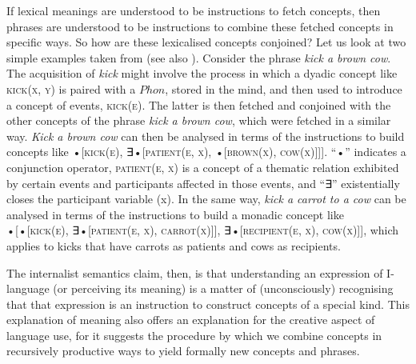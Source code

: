 If lexical meanings are understood to be instructions to fetch concepts, then phrases are understood to be instructions to combine these fetched concepts in specific ways. So how are these lexicalised concepts conjoined? Let us look at two simple examples taken from \citet[249--250]{Pietroski2010} (see also \citealt{Pietroski2018}). Consider the phrase \textit{kick a brown cow}. The acquisition of \textit{kick} might involve the process in which a dyadic concept like \textsc{kick(x, y)} is paired with a $Phon$, stored in the mind, and then used to introduce a concept of events, \textsc{kick(e)}. The latter is then fetched and conjoined with the other concepts of the phrase \textit{kick a brown cow}, which were fetched in a similar way. \textit{Kick a brown cow} can then be analysed in terms of the instructions to build concepts like \textsc{•[kick(e), ∃•[patient(e, x), •[brown(x),  cow(x)]]]}. “•” indicates a conjunction operator, \textsc{patient(e, x)} is a concept of a thematic relation exhibited by certain events and participants affected in those events, and “∃” existentially closes the participant variable (x). In the same way, \textit{kick a carrot to a cow} can be analysed in terms of the instructions to build a monadic concept like \textsc{•[•[kick(e), ∃•[patient(e, x), carrot(x)]], ∃•[recipient(e, x), cow(x)]]}, which applies to kicks that have carrots as patients and cows as recipients.
	
The internalist semantics claim, then, is that understanding an expression of I-language (or perceiving its meaning) is a matter of (unconsciously) recognising that that expression is an instruction to construct concepts of a special kind. This explanation of meaning also offers an explanation for the creative aspect of language use, for it suggests the procedure by which we combine concepts in recursively productive ways to yield formally new concepts and phrases.
	
